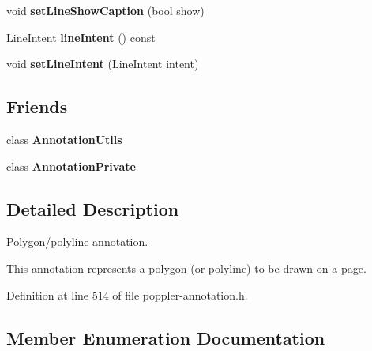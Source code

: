 \begin{DoxyCompactItemize}
\mbox{\label{class_poppler_1_1_line_annotation_a4859ac01696026a5ce014a6a8694a7eb}} 
void {\bfseries set\+Line\+Show\+Caption} (bool show)
\item 
\mbox{\label{class_poppler_1_1_line_annotation_a16f909ee25462bf9cc02fa59606b5191}} 
Line\+Intent {\bfseries line\+Intent} () const
\item 
\mbox{\label{class_poppler_1_1_line_annotation_a8ff2bd6a88a14dface994d42d3aefb56}} 
void {\bfseries set\+Line\+Intent} (Line\+Intent intent)
\end{DoxyCompactItemize}
\subsection*{Friends}
\begin{DoxyCompactItemize}
\item 
\mbox{\label{class_poppler_1_1_line_annotation_a13daac1cbc1823e18498579fc26b344f}} 
class {\bfseries Annotation\+Utils}
\item 
\mbox{\label{class_poppler_1_1_line_annotation_add0bc3e32e560f9e9eb3025587c1ad54}} 
class {\bfseries Annotation\+Private}
\end{DoxyCompactItemize}


\subsection{Detailed Description}
Polygon/polyline annotation. 

This annotation represents a polygon (or polyline) to be drawn on a page. 

Definition at line 514 of file poppler-\/annotation.\+h.



\subsection{Member Enumeration Documentation}
\mbox{\label{class_poppler_1_1_line_annotation_a0bcd4ea8f032803eb08e0411f78e0304}} 
